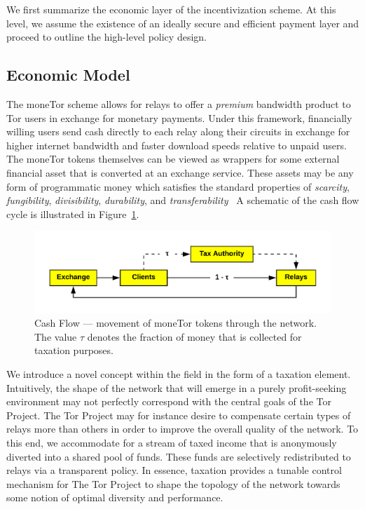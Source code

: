
We first summarize the economic layer of the incentivization scheme. At this
level, we assume the existence of an ideally secure and efficient payment layer
and proceed to outline the high-level policy design. 

\subsection{Economic Model}
The moneTor scheme allows for relays to offer a \emph{premium} bandwidth product
to Tor users in exchange for monetary payments. Under this framework,
financially willing users send cash directly to each relay along their circuits
in exchange for higher internet bandwidth and faster download speeds relative to
unpaid users. The moneTor tokens themselves can be viewed as wrappers for some
external financial asset that is converted at an exchange service. These assets
may be any form of programmatic money which satisfies the standard properties of
\textit{scarcity}, \textit{fungibility}, \textit{divisibility},
\textit{durability}, and
\textit{transferability}~\cite[p.3]{crump2011phenomenon} A schematic of the cash
flow cycle is illustrated in Figure~\ref{fig:economic}.
\begin{figure}[h] \centering
  \includegraphics[trim={0.5cm, 0.5cm, 0.5cm, 0.5cm}, clip, scale=0.7]{images/economic_diagram.png}
  \caption[Cash Flow]{Cash Flow --- movement of moneTor tokens through the
    network. The value $\tau$ denotes the fraction of money that is collected
    for taxation purposes.}
  \label{fig:economic}
\end{figure}
We introduce a novel concept within the field in the form of a
taxation element. Intuitively, the shape of the network that will
emerge in a purely profit-seeking environment may not perfectly
correspond with the central goals of the Tor Project. The Tor Project
may for instance desire to compensate certain types of relays more
than others in order to improve the overall quality of the network. To
this end, we accommodate for a stream of taxed income that is
anonymously diverted into a shared pool of funds. These funds are
selectively redistributed to relays via a transparent policy.  In
essence, taxation provides a tunable control mechanism for The Tor
Project to shape the topology of the network towards some notion of
optimal diversity and performance.

